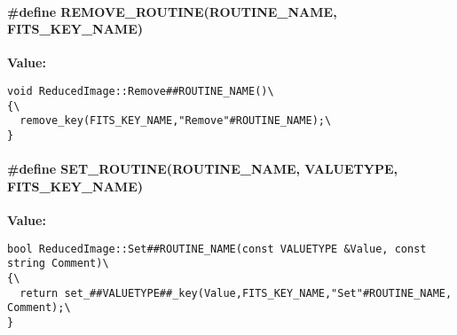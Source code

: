 \paragraph{\setlength{\rightskip}{0pt plus 5cm}\#define REMOVE\_\-ROUTINE(ROUTINE\_\-NAME, FITS\_\-KEY\_\-NAME)}\hfill\label{reducedimage_cc_a4}


{\bf Value:}\footnotesize\begin{verbatim}void ReducedImage::Remove##ROUTINE_NAME()\
{\
  remove_key(FITS_KEY_NAME,"Remove"#ROUTINE_NAME);\
}
\end{verbatim}\normalsize 
{}
\paragraph{\setlength{\rightskip}{0pt plus 5cm}\#define SET\_\-ROUTINE(ROUTINE\_\-NAME, VALUETYPE, FITS\_\-KEY\_\-NAME)}\hfill\label{reducedimage_cc_a3}


{\bf Value:}\footnotesize\begin{verbatim}bool ReducedImage::Set##ROUTINE_NAME(const VALUETYPE &Value, const string Comment)\
{\
  return set_##VALUETYPE##_key(Value,FITS_KEY_NAME,"Set"#ROUTINE_NAME, Comment);\
}
\end{verbatim}\normalsize 
